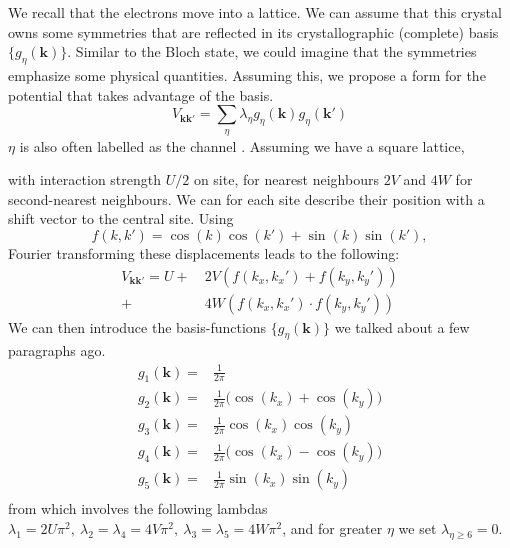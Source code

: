 \documentclass[../main.tex]{subfile}
\begin{document}
We recall that the electrons move into a lattice. We can assume that this crystal owns some symmetries that are reflected in its crystallographic (complete) basis $\{g_{\eta}(\bm{k})\}$.
Similar to the Bloch state, we could imagine that the symmetries emphasize some physical quantities. Assuming this, we propose a form for the potential that takes advantage
of the basis.
\[
    V_{\bm{k}\bm{k}'} = \sum_{\eta} \lambda_{\eta} g_{\eta}(\bm{k})g_{\eta}(\bm{k}')
\]
$\eta$ is also often labelled as the channel \cite{FossheimSudbo2004}. Assuming we have a square lattice, 
\begin{figure}[H]
    \centering
\end{figure}
with interaction strength $U/2$ on site, for nearest neighbours $2V$ and $4W$ for second-nearest neighbours. We can for each site describe their position with a shift vector 
to the central site. Using
\[
    f(k,k')=\cos(k)\cos(k')+\sin(k)\sin(k'),
\]
Fourier transforming these displacements leads to the following:
\[
\begin{aligned}
    V_{\bm{k}\bm{k}'} = U + &~2V\left(f(k_x,k_x')+ f(k_y,k_y')\right)\\
    + &~4W \left(f(k_x,k_x') \cdot f(k_y,k_y')\right)
\end{aligned} 
\]
We can then introduce the basis-functions $\{g_{\eta}(\bm{k})\}$ we talked about a few paragraphs ago.
\begin{align*}
    g_{1}(\bm{k}) =& \frac{1}{2\pi}\\
    g_{2}(\bm{k}) =& \frac{1}{2\pi}\bigl( \cos(k_x) + \cos(k_y)\bigr) \tag{$s$-wave}\\
    g_{3}(\bm{k}) =& \frac{1}{2\pi}\cos(k_x) \cos(k_y)\\
    g_{4}(\bm{k}) =& \frac{1}{2\pi}\bigl( \cos(k_x) - \cos(k_y)\bigr) \tag{$d$-wave}\\
    g_{5}(\bm{k}) =& \frac{1}{2\pi}\sin(k_x) \sin(k_y)\\
\end{align*}
from which involves the following lambdas $\lambda_1 = 2U\pi^2, ~ \lambda_2=\lambda_4 = 4V\pi^2, ~ \lambda_3=\lambda_5=4W \pi^2$, and for greater
$\eta$ we set $\lambda_{\eta\ge6} =0$.\\
\end{document}
